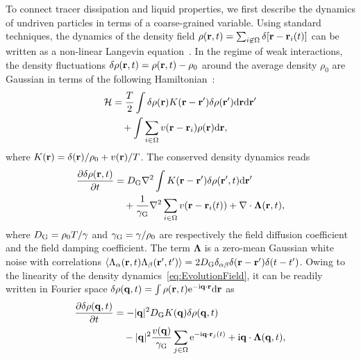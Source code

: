 \documentclass[pre, superscriptaddress, twocolumn,pre]{revtex4-1}
\newcommand{\dd}{\text{d}}
\newcommand{\ee}{\text{e}}
\newcommand{\ii}{\text{i}}
\begin{document}
To connect tracer dissipation and liquid properties, we first describe the dynamics of undriven particles in terms of a coarse-grained variable. Using standard techniques, the dynamics of the density field $\rho({\bf r},t) = \sum_{i\not\in\Omega}\delta[{\bf r}-{\bf r}_i(t)]$ can be written as a non-linear Langevin equation~\cite{Dean1996}. In the regime of weak interactions, the density fluctuations $\delta \rho({\bf r},t ) = \rho({\bf r}, t) - \rho_0$ around the average density $\rho_0$ are Gaussian in terms of the following Hamiltonian~\cite{Chandler1993, Demery2014, Kruger2017}:
\begin{equation}
	\begin{aligned}
		{\cal H} &= \frac{T}{2} \int \delta \rho ({\bf r}) K({\bf r} - {\bf r}') \delta \rho ({\bf r}') \dd{\bf r}\dd{\bf r}'
		\\
		&\quad + \int \sum_{i\in\Omega} v({\bf r}-{\bf r}_i) \rho({\bf r}) \dd{\bf r} ,
	\end{aligned}
\end{equation}
where $K({\bf r})= \delta({\bf r})/\rho_0 + v({\bf r})/T$. The conserved density dynamics reads
\begin{equation}\label{eq:EvolutionField}
	\begin{aligned}
		\frac{\partial \delta \rho({\bf r}, t)}{\partial t} &= D_{\rm G} \nabla^2 \int K({\bf r}-{\bf r}') \delta \rho({\bf r}', t) \dd{\bf r}'
		\\
		&\quad + \frac{1}{\gamma_{\rm G}} \nabla^2 \sum_{i\in\Omega}v({\bf r}-{\bf r}_i(t)) + \nabla \cdot {\boldsymbol\Lambda}({\bf r},t) ,
	\end{aligned}
\end{equation}
where $D_{\rm G} = \rho_0 T/\gamma$ and $\gamma_{\rm G}=\gamma/\rho_0$ are respectively the field diffusion coefficient and the field damping coefficient. The term $\boldsymbol\Lambda$ is a zero-mean Gaussian white noise with correlations $\langle \Lambda_\alpha({\bf r}, t) \Lambda_\beta({\bf r}', t') \rangle = 2 D_{\rm G} \delta_{\alpha\beta}\delta({\bf r} - {\bf r}')\delta(t-t')$. Owing to the linearity of the density dynamics~\eqref{eq:EvolutionField}, it can be readily written in Fourier space $\delta\rho({\bf q},t)=\int\rho({\bf r},t){\rm e}^{-{\rm i}{\bf q}\cdot{\bf r}} {\rm d}{\bf r}$ as
\begin{equation}\label{eq:FourierEvolutionField}
	\begin{aligned}
		\frac{\partial \delta \rho({\bf q},t)}{\partial t} &= - |{\bf q}|^2 D_{\rm G} K({\bf q}) \delta \rho({\bf q},t)
		\\
		&\quad - |{\bf q}|^2 \frac{v({\bf q})}{\gamma_{\rm G}} \sum_{j\in\Omega}\ee^{-\ii {\bf q} \cdot {\bf r}_j(t)} + \ii{\bf q}\cdot{\boldsymbol\Lambda} ({\bf q},t) ,
	\end{aligned}
\end{equation}
\end{document}
